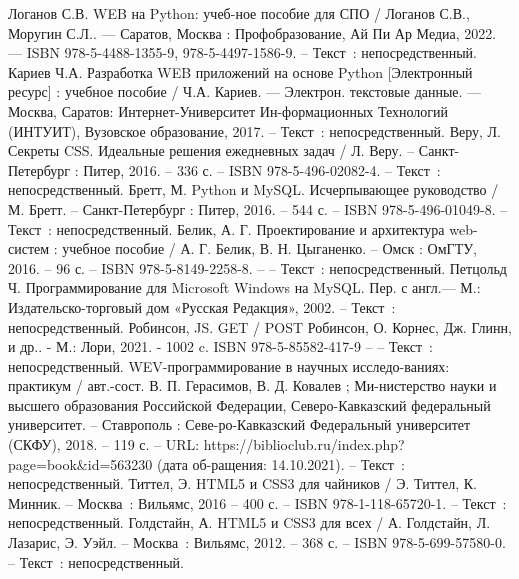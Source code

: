 
\begin{thebibliography}{9}

     Логанов С.В. WEB на Python: учеб-ное пособие для СПО / Логанов С.В., Моругин С.Л.. — Саратов, Москва : Профобразование, Ай Пи Ар Медиа, 2022. — ISBN 978-5-4488-1355-9, 978-5-4497-1586-9. – Текст~: непосредственный.
     Кариев Ч.А. Разработка WEB приложений на основе Python [Электронный ресурс] : учебное пособие / Ч.А. Кариев. — Электрон. текстовые данные. — Москва, Саратов: Интернет-Университет Ин-формационных Технологий (ИНТУИТ), Вузовское образование, 2017. – Текст~: непосредственный.
     Веру, Л. Секреты CSS. Идеальные решения ежедневных задач / Л. Веру. – Санкт-Петербург : Питер, 2016. – 336 с. – ISBN 978-5-496-02082-4. – Текст~: непосредственный.
     Бретт, М. Python и MySQL. Исчерпывающее руководство / М. Бретт. – Санкт-Петербург : Питер, 2016. – 544 с. – ISBN 978-5-496-01049-8. – Текст~: непосредственный.
		Белик, А. Г. Проектирование и архитектура web-систем : учебное пособие / А. Г. Белик, В. Н. Цыганенко. – Омск : ОмГТУ, 2016. – 96 с. – ISBN 978-5-8149-2258-8. – – Текст~: непосредственный.
	 Петцольд Ч. Программирование для Microsoft Windows на MySQL. Пер. с англ.— М.: Издательско-торговый дом «Русская Редакция», 2002.  – Текст~: непосредственный.
	 Робинсон, JS. GET / POST Робинсон, О. Корнес, Дж. Глинн, и др.. - М.: Лори, 2021. - 1002 c. ISBN 978-5-85582-417-9 – – Текст~: непосредственный.
	 WEV-программирование в научных исследо-ваниях: практикум / авт.-сост. В. П. Герасимов, В. Д. Ковалев ; Ми-нистерство науки и высшего образования Российской Федерации, Северо-Кавказский федеральный университет. – Ставрополь : Севе-ро-Кавказский Федеральный университет (СКФУ), 2018. – 119 с. – URL: https://biblioclub.ru/index.php?page=book&id=563230 (дата об-ращения: 14.10.2021). – Текст~: непосредственный.
		Титтел, Э. HTML5 и CSS3 для чайников / Э. Титтел, К. Минник. – Москва~: Вильямс, 2016 – 400 с. – ISBN 978-1-118-65720-1. – Текст~: непосредственный.     
		Голдстайн, А. HTML5 и CSS3 для всех / А. Голдстайн, Л. Лазарис, Э. Уэйл. – Москва~: Вильямс, 2012. – 368 с. – ISBN 978-5-699-57580-0. – Текст~: непосредственный.
\end{thebibliography}
